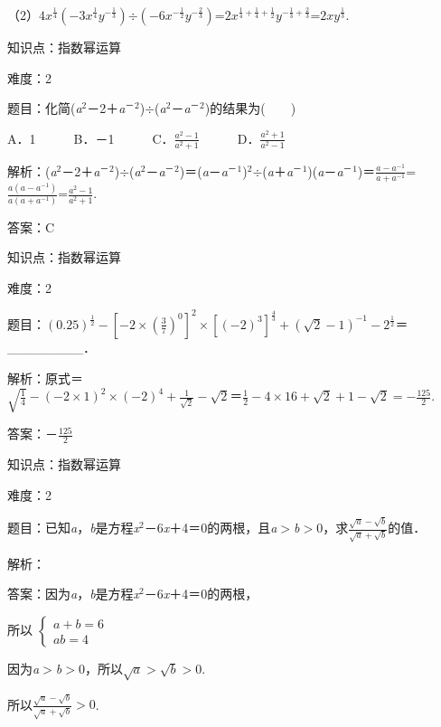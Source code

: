 \documentclass{article} %
\begin{document}
（2）$4x^{\frac{1}{4}}(-3x^{\frac{1}{4}}y^{-\frac{1}{3}})$$\div$$(-6x^{-\frac{1}{2}}y^{-\frac{2}{3}})$=$2x^{\frac{1}{4}+\frac{1}{4}+\frac{1}{2}}y^{-\frac{1}{3}+\frac{2}{3}}$=$2xy^{\frac{1}{3}}$.

知识点：指数幂运算

难度：2

题目：化简(\textit{a}${}^{2}$－2＋\textit{a}${}^{\textrm{－}}$${}^{2}$)$\mathrm{\div}$(\textit{a}${}^{2}$－\textit{a}${}^{\textrm{－}}$${}^{2}$)的结果为(　　)

A．1　　　B．－1　　　C．$\frac{a^{2}-1}{a^{2}+1}$　　　D．$\frac{a^{2}+1}{a^{2}-1}$

解析：(\textit{a}${}^{2}$－2＋\textit{a}${}^{\textrm{－}}$${}^{2}$)$\mathrm{\div}$(\textit{a}${}^{2}$－\textit{a}${}^{\textrm{－}}$${}^{2}$)＝(\textit{a}－\textit{a}${}^{\textrm{－}}$${}^{1}$)${}^{2}$$\mathrm{\div}$(\textit{a}＋\textit{a}${}^{\textrm{－}}$${}^{1}$)(\textit{a}－\textit{a}${}^{\textrm{－}}$${}^{1}$)＝$\frac{a-a^{-1}}{a+a^{-1}}$=$\frac{a(a-a^{-1})}{a(a+a^{-1})}$=$\frac{a^{2}-1}{a^{2}+1}$.

答案：C

知识点：指数幂运算

难度：2

题目：$(0.25)^{\frac{1}{2}}-[-2\times(\frac{3}{7})^{0}]^{2}\times[(-2)^{3}]^{\frac{4}{3}}+(\sqrt{2}-1)^{-1}-2^{\frac{1}{2}}$＝\_\_\_\_\_\_\_\_．

解析：原式＝$\sqrt{\frac{1}{4}}-(-2\times 1)^{2}\times(-2)^{4}+\frac{1}{\sqrt{2}}-\sqrt{2}＝\frac{1}{2}-4\times 16+\sqrt{2}+1-\sqrt{2}=-\frac{125}{2}$.

答案：$－\frac{125}{2}$

知识点：指数幂运算

难度：2

题目：已知\textit{a}，\textit{b}是方程\textit{x}${}^{2}$－6\textit{x}＋4＝0的两根，且\textit{a}$\mathrm{>}$\textit{b}$\mathrm{>}$0，求$\frac{\sqrt{a}-\sqrt{b}}{\sqrt{a}+\sqrt{b}}$的值．

解析：

答案：因为\textit{a}，\textit{b}是方程\textit{x}${}^{2}$－6\textit{x}＋4＝0的两根，

所以
$\left\{
\begin{aligned}
a+b=6\\
ab=4
\end{aligned}
\right.
$

因为\textit{a}$\mathrm{>}$\textit{b}$\mathrm{>}$0，所以$\sqrt{a}\mathrm{>}\sqrt{b}\mathrm{>}0$.

所以$\frac{\sqrt{a}-\sqrt{b}}{\sqrt{a}+\sqrt{b}}\mathrm{>}0$.
\end{document}
